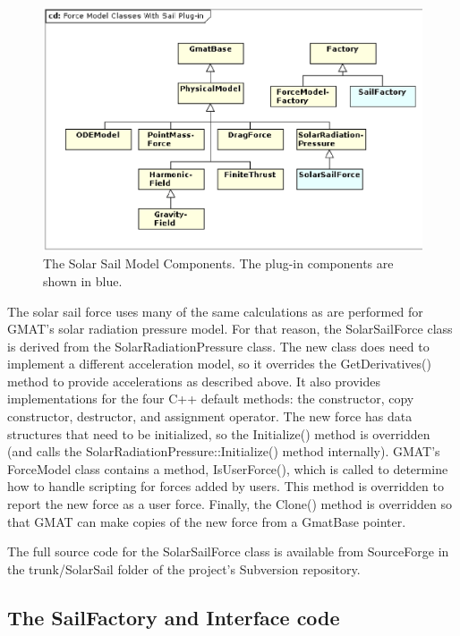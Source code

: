 \begin{figure}[tb]
\begin{center}
\includegraphics*[scale=0.35]{Images/ForceModelClassesWithSailPlugin.ps}
\caption[The Solar Sail Model Components]{\label{figure:ForceModelWithSail} The
Solar Sail Model Components.  The plug-in components are shown in blue.}
\end{center}
\end{figure}

The solar sail force uses many of the same calculations as are performed for
GMAT's solar radiation pressure model.  For that reason, the SolarSailForce
class is derived from the SolarRadiationPressure class.  The new class does need
to implement a different acceleration model, so it overrides the
GetDerivatives() method to provide accelerations as described above. It also
provides implementations for the four C++ default methods: the constructor, copy
constructor, destructor, and assignment operator.  The new force has data
structures that need to be initialized, so the Initialize() method is overridden
(and calls the SolarRadiationPressure::Initialize() method internally).  GMAT's
ForceModel class contains a method, IsUserForce(), which is called to determine
how to handle scripting for forces added by users.  This method is overridden to
report the new force as a user force. Finally, the Clone() method is overridden
so that GMAT can make copies of the new force from a GmatBase pointer.

The full source code for the SolarSailForce class is available from
SourceForge\cite{plugins} in the trunk/SolarSail folder of the project's
Subversion repository.

\subsection{The SailFactory and Interface code}

